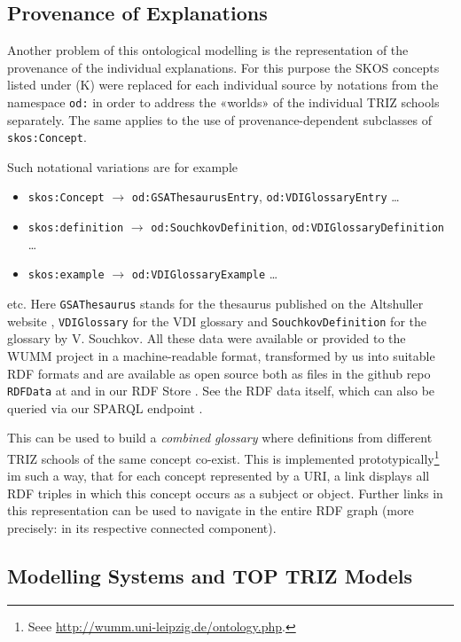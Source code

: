 \documentclass[11pt,a4paper]{article}
\begin{document}
\subsection{Provenance of Explanations}

Another problem of this ontological modelling is the representation of the
provenance of the individual explanations. For this purpose the SKOS concepts
listed under (K) were replaced for each individual source by notations from
the namespace \texttt{od:} in order to address the «worlds» of the individual
TRIZ schools separately.  The same applies to the use of provenance-dependent
subclasses of \texttt{skos:Concept}.

Such notational variations are for example
\begin{itemize}[noitemsep]
\item \texttt{skos:Concept} $\to$ \texttt{od:GSAThesaurusEntry},
  \texttt{od:VDIGlossaryEntry} \ldots
\item \texttt{skos:definition} $\to$ \texttt{od:SouchkovDefinition},
  \texttt{od:VDIGlossaryDefinition} \ldots
\item \texttt{skos:example} $\to$ \texttt{od:VDIGlossaryExample} \ldots
\end{itemize}
etc.  Here \texttt{GSAThesaurus} stands for the thesaurus published on the
Altshuller website \cite{GSA}, \texttt{VDIGlossary} for the VDI glossary
\cite{VDI} and \texttt{SouchkovDefinition} for the glossary
\cite{Souchkov2018} by V. Souchkov. All these data were available or provided
to the WUMM project in a machine-readable format, transformed by us into
suitable RDF formats and are available as open source both as files in the
github repo \texttt{RDFData} at \cite{WUMM-github} and in our RDF Store
\cite{WUMM-store}. See the RDF data itself, which can also be queried via our
SPARQL endpoint \cite{WUMM-sparql}.

This can be used to build a \emph{combined glossary} where definitions from
different TRIZ schools of the same concept co-exist. This is implemented
prototypically\footnote{Seee \url{http://wumm.uni-leipzig.de/ontology.php}.}
im such a way, that for each concept represented by a URI, a link displays all
RDF triples in which this concept occurs as a subject or object. Further links
in this representation can be used to navigate in the entire RDF graph (more
precisely: in its respective connected component).

\subsection{Modelling Systems and TOP TRIZ Models}
\end{document}
